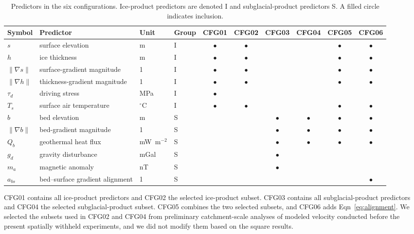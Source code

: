 \documentclass[review,jog]{igs}
\providecommand{\toprule}{\hline}
\providecommand{\midrule}{\hline}
\providecommand{\bottomrule}{\hline}
\begin{document}
\begin{table}
\caption{Predictors in the six configurations. Ice-product predictors are denoted I and subglacial-product predictors S. A filled circle indicates inclusion.}
\label{tab:configurations}
\centering
\ifdefined\FinalPass\tiny\setlength{\tabcolsep}{3pt}\else\scriptsize\fi
\begin{tabular}{llllcccccc}
\toprule
Symbol & Predictor & Unit & Group & CFG01 & CFG02 & CFG03 & CFG04 & CFG05 & CFG06\\
\midrule
$s$ & surface elevation & m & I & $\bullet$ & $\bullet$ & & & $\bullet$ & $\bullet$\\
$h$ & ice thickness & m & I & $\bullet$ & $\bullet$ & & & $\bullet$ & $\bullet$\\
$\lVert\nabla s\rVert$ & surface-gradient magnitude & 1 & I & $\bullet$ & $\bullet$ & & & $\bullet$ & $\bullet$\\
$\lVert\nabla h\rVert$ & thickness-gradient magnitude & 1 & I & $\bullet$ & $\bullet$ & & & $\bullet$ & $\bullet$\\
$\tau_d$ & driving stress & MPa & I & $\bullet$ & & & & &\\
$T_s$ & surface air temperature & $^\circ$C & I & $\bullet$ & $\bullet$ & & & $\bullet$ & $\bullet$\\
$b$ & bed elevation & m & S & & & $\bullet$ & $\bullet$ & $\bullet$ & $\bullet$\\
$\lVert\nabla b\rVert$ & bed-gradient magnitude & 1 & S & & & $\bullet$ & $\bullet$ & $\bullet$ & $\bullet$\\
$Q_b$ & geothermal heat flux & mW~m$^{-2}$ & S & & & $\bullet$ & $\bullet$ & $\bullet$ & $\bullet$\\
$g_d$ & gravity disturbance & mGal & S & & & $\bullet$ & & &\\
$m_a$ & magnetic anomaly & nT & S & & & $\bullet$ & & &\\
$a_{bs}$ & bed--surface gradient alignment & 1 & S & & & & & & $\bullet$\\
\bottomrule
\end{tabular}
\end{table}

CFG01 contains all ice-product predictors and CFG02 the selected ice-product subset. CFG03 contains all subglacial-product predictors and CFG04 the selected subglacial-product subset. CFG05 combines the two selected subsets, and CFG06 adds Eqn~\ref{eq:alignment}. We selected the subsets used in CFG02 and CFG04 from preliminary catchment-scale analyses of modeled velocity conducted before the present spatially withheld experiments, and we did not modify them based on the square results.
\end{document}
